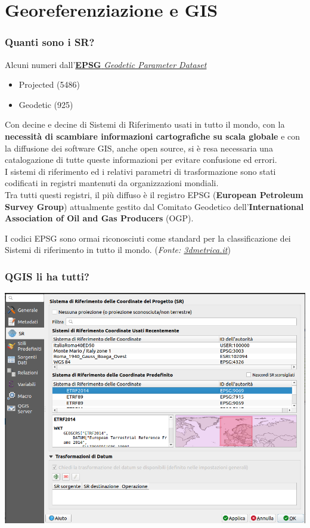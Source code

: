 \documentclass{beamer}
\begin{document}
{\section{Georeferenziazione e GIS}

\begin{frame}
   \frametitle{Quanti sono i SR?}

   Alcuni numeri dall'\href{https://epsg.io/?q=}
        {\textbf{EPSG} \textit{Geodetic Parameter Dataset}}

   \begin{itemize}
        \item Projected (5486)
        \item Geodetic (925)
   \end{itemize}

{\small Con decine e decine di Sistemi di Riferimento usati in tutto il mondo, con la \textbf{necessità di scambiare informazioni cartografiche su scala globale} e con la diffusione dei software GIS, anche open source, si è resa necessaria una catalogazione di tutte queste informazioni per evitare confusione ed errori.\\
I sistemi di riferimento ed i relativi parametri di trasformazione sono stati codificati in registri mantenuti da organizzazioni mondiali.\\
Tra tutti questi registri, il più diffuso è il registro EPSG (\textbf{European Petroleum Survey Group}) attualmente gestito dal Comitato Geodetico dell'\textbf{International Association of Oil and Gas Producers} (OGP).

I codici EPSG sono ormai riconosciuti come standard per la classificazione dei Sistemi di riferimento in tutto il mondo. (\textsl{Fonte: \href{https://3dmetrica.it/i-codici-epsg/}
        {3dmetrica.it}})}

\end{frame}

\begin{frame}
   \frametitle{QGIS li ha tutti?}

         \begin{center}
      		\includegraphics[height=.9\textheight, scale=1] {./pics_2022_03/qgis_sr.png}	
      	\end{center} 


\end{frame}}
\end{document}
